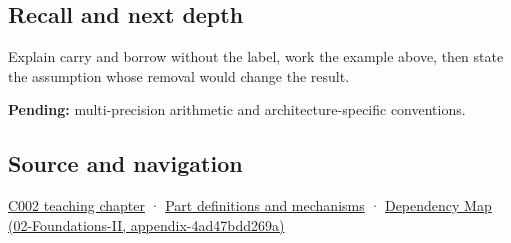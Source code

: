 \subsection{Recall and next depth}\label{recall-and-next-depth}

Explain carry and borrow without the label, work the example above, then state the assumption whose removal would change the result.

\textbf{Pending:} multi-precision arithmetic and architecture-specific conventions.

\subsection{Source and navigation}\label{source-and-navigation}

\href{Continuous\%20Notes/Computing\%20Foundations\%20-\%20From\%20Bits\%20to\%20C++\%20and\%20Systems\%20APIs\#Arithmetic\%20becomes\%20a\%20policy}{C002 teaching chapter} · \hyperref[appendix-fd090d982a15]{Part definitions and mechanisms} · \href{}{Dependency Map (02-Foundations-II, appendix-4ad47bdd269a)}
